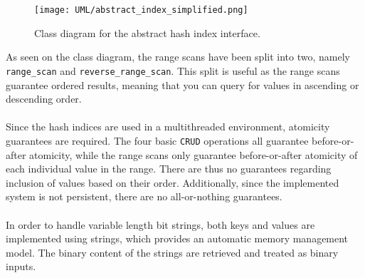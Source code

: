 \documentclass[11pt]{report} %
\begin{document}
\begin{figure}[H]
  \centering
  \texttt{[image: UML/abstract\_index\_simplified.png]}\\
  \caption{Class diagram for the abstract hash index interface.}\label{fig:UML_abstract_hash_index}
\end{figure}
\noindent
As seen on the class diagram, the range scans have been split into two, namely \verb|range_scan| and \verb|reverse_range_scan|. This split is useful as the range scans guarantee ordered results, meaning that you can query for values in ascending or descending order.\\
\\
Since the hash indices are used in a multithreaded environment, atomicity guarantees are required. The four basic \verb|CRUD| operations all guarantee before-or-after atomicity, while the range scans only guarantee before-or-after atomicity of each individual value in the range. There are thus no guarantees regarding inclusion of values based on their order. Additionally, since the implemented system is not persistent, there are no all-or-nothing guarantees.\\
\\
In order to handle variable length bit strings, both keys and values are implemented using strings, which provides an automatic memory management model. The binary content of the strings are retrieved and treated as binary inputs.

\end{document}
